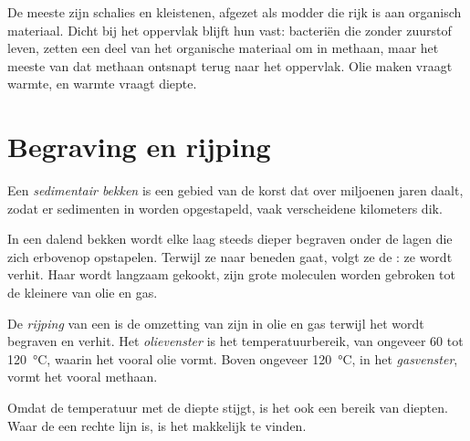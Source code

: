 De meeste  zijn schalies en kleistenen, afgezet als modder die rijk is aan
organisch materiaal. Dicht bij het oppervlak blijft hun  vast: bacteriën die
zonder zuurstof leven, zetten een deel van het organische materiaal om in methaan, maar het meeste
van dat methaan ontsnapt terug naar het oppervlak. Olie maken vraagt warmte, en warmte vraagt diepte.

\section{Begraving en rijping}

\begin{definition}\label{def:g11:fossil-fuel-geology:basin}
Een \emph{sedimentair bekken} is een gebied van de korst
dat over miljoenen jaren daalt, zodat er sedimenten in worden opgestapeld, vaak
verscheidene kilometers dik.
\end{definition}

In een dalend bekken wordt elke laag steeds dieper begraven onder de lagen
die zich erbovenop opstapelen. Terwijl ze naar beneden gaat, volgt ze de : ze wordt
verhit. Haar  wordt langzaam gekookt, zijn grote moleculen worden gebroken tot de
kleinere van olie en gas.

\begin{definition}\label{def:g11:fossil-fuel-geology:oil-window}
De \emph{rijping} van een  is de
omzetting van zijn  in olie en gas terwijl het wordt begraven en verhit.
Het \emph{olievenster} is het temperatuurbereik, van
ongeveer 60 tot \qty{120}{\degreeCelsius}, waarin het  vooral olie vormt.
Boven ongeveer \qty{120}{\degreeCelsius}, in het
\emph{gasvenster}, vormt het vooral methaan.
\end{definition}

Omdat de temperatuur met de diepte stijgt, is het  ook een bereik van
diepten. Waar de  een rechte lijn is, is het makkelijk te vinden.

